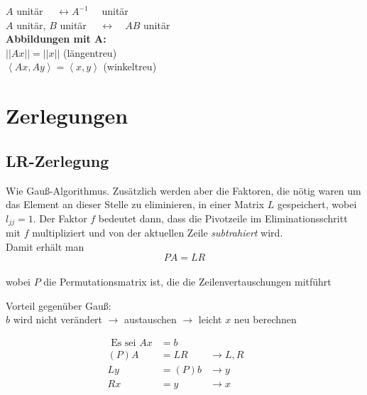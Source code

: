 \documentclass[a4paper,twocolumn]{article}
\begin{document}
		\begin{feig}[Eigenschaften]
			$A$ unitär $\quad \leftrightarrow A^{-1} \quad$ unitär\\
			$A$ unitär, $B$ unitär $\quad \leftrightarrow \quad AB$ unitär\\[2mm]
			\textbf{Abbildungen mit A:}\\
			$||Ax|| = ||x||$ (längentreu)\\
			$\left< Ax, Ay \right> = \left< x,y \right>$ (winkeltreu)
		\end{feig}

	
\section{Zerlegungen}
	
	\vspace{-2mm}
	\subsection{LR-Zerlegung}
		
		\begin{falgo}[LR-Zerlegung]
			Wie Gauß-Algorithmus. Zusätzlich werden aber die Faktoren, die nötig waren um das Element an dieser Stelle zu 
			eliminieren, in einer Matrix $L$ gespeichert, wobei $l_{jj} = 1$. Der Faktor $f$ bedeutet dann, dass die Pivotzeile
			im Eliminationsschritt mit $f$ multipliziert und von der aktuellen Zeile \textit{subtrahiert} wird. \\

			Damit erhält man \vspace{-1mm} $$PA = LR$$\\[-6mm] wobei $P$ die Permutationsmatrix ist, die die Zeilenvertauschungen mitführt
		\end{falgo}
		
		Vorteil gegenüber Gauß: \\
		$b$ wird nicht verändert $\rightarrow$ austauschen $\rightarrow$ leicht $x$ neu berechnen
		
		\begin{fmerke}
			\vspace{-4mm}
			\begin{align*}
				\text{ Es sei } Ax & = b \\
				(P)A & = LR   &\rightarrow  L,R &\quad \\
				Ly   & = (P)b &\rightarrow  y &\quad \\
				Rx   & = y    &\rightarrow  x &\quad
			\end{align*}
			\vspace{-6mm}
		\end{fmerke}
		
\end{document}
